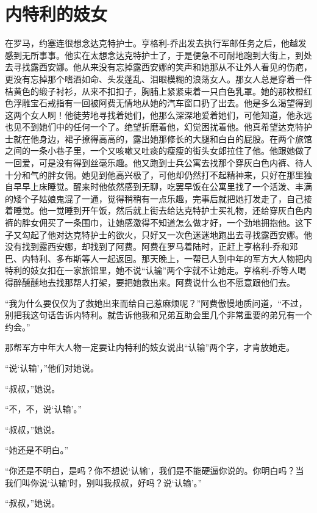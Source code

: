 \chapter{内特利的妓女}
 
    在罗马，约塞连很想念达克特护士。亨格利-乔出发去执行军邮任务之后，他越发感到无所事事。他实在太想念达克特护士了，于是便急不可耐地跑到大街上，到处去寻找露西安娜。他从来没有忘掉露西安娜的笑声和她那从不让外人看见的伤疤，更没有忘掉那个嗜酒如命、头发蓬乱、泪眼模糊的浪荡女人。那女人总是穿着一件桔黄色的缎子衬衫，从来不扣扣子，胸脯上紧紧束着一只白色乳罩。她的那枚橙红色浮雕宝石戒指有一回被阿费无情地从她的汽车窗口扔了出去。他是多么渴望得到这两个女人啊！他徒劳地寻找着她们，他那么深深地爱着她们，可他知道，他永远也见不到她们中的任何一个了。绝望折磨着他，幻觉困扰着他。他真希望达克特护士就在他身边，裙子撩得高高的，露出她那修长的大腿和白白的屁股。在两个旅馆之间的一条小巷子里，一个又咳嗽又吐痰的瘦瘦的街头女郎拉住了他。他跟她做了一回爱，可是没有得到丝毫乐趣。他又跑到士兵公寓去找那个穿灰白色内裤、待人十分和气的胖女佣。她见到他高兴极了，可他却仍然打不起精神来，只好在那里独自早早上床睡觉。醒来时他依然感到无聊，吃罢早饭在公寓里找了一个活泼、丰满的矮个子姑娘鬼混了一通，觉得稍稍有一点乐趣，完事后就把她打发走了，自己接着睡觉。他一觉睡到开午饭，然后就上街去给达克特护士买礼物，还给穿灰白色内裤的胖女佣买了一条围巾，让她感激得不知道怎么做才好，一个劲地拥抱他。这下子又勾起了他对达克特护士的欲火，只好又一次色迷迷地跑出去寻找露西安娜。他没有找到露西安娜，却找到了阿费。阿费在罗马着陆时，正赶上亨格利-乔和邓巴、内特利、多布斯等人一起返回。那天晚上，一帮已人到中年的军方大人物把内特利的妓女扣在一家旅馆里，她不说“认输”两个字就不让她走。亨格利-乔等人喝得醉醺醺地去找那帮人打架，要把她救出来。阿费说什么也不愿意跟他们去。

    “我为什么要仅仅为了救她出来而给自己惹麻烦呢？”阿费傲慢地质问道，“不过，别把我这句话告诉内特利。就告诉他我和兄弟互助会里几个非常重要的弟兄有一个约会。”

    那帮军方中年大人物一定要让内特利的妓女说出“认输”两个字，才肯放她走。

    “说‘认输’，”他们对她说。

    “叔叔，”她说。

    “不，不，说‘认输’。”

    “叔叔，”她说。

    “她还是不明白。”

    “你还是不明白，是吗？你不想说‘认输’，我们是不能硬逼你说的。你明白吗？当我们叫你说‘认输’时，别叫我叔叔，好吗？说‘认输’。”

    “叔叔，”她说。

